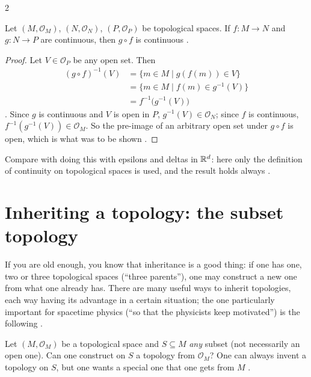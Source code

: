 \begin{paracol}{2}
\begin{theorem}\label{thm:c01-composition}
Let $(M,\mathcal O_M)$, $(N,\mathcal O_N)$, $(P,\mathcal O_P)$ be topological spaces. If $f\colon M\to N$ and $g\colon N\to P$ are continuous, then
$g\circ f$ is continuous .
\end{theorem}
\begin{proof}
Let $V\in\mathcal O_P$ be any open set. Then
\begin{align*}
  (g\circ f)^{-1}(V)&=\{m\in M\mid g(f(m))\in V\}\\
  &=\{m\in M\mid f(m)\in g^{-1}(V)\}\\
  &=f^{-1}\bigl(g^{-1}(V)\bigr)
\end{align*}
. Since $g$ is continuous and $V$ is open in $P$, $g^{-1}(V)\in\mathcal O_N$; since $f$ is
continuous, $f^{-1}(g^{-1}(V))\in\mathcal O_M$. So the pre-image of an arbitrary open set under $g\circ f$ is open, which is what was to be shown
.
\end{proof}
Compare with doing this with epsilons and deltas in $\mathbb{R}^d$: here only the definition of continuity on topological spaces is used, and the result holds always
.

\section{Inheriting a topology: the subset topology}\label{sec:c01-subset}

If you are old enough, you know that inheritance is a good thing: if one has one, two or three topological spaces (``three parents''), one may construct a new one from what one
already has. There are many useful ways to inherit topologies, each way having its advantage in a certain situation; the one particularly important for spacetime physics
(``so that the physicists keep motivated'') is the following .

Let $(M,\mathcal O_M)$ be a topological space and $S\subseteq M$ \emph{any} subset (not necessarily an open one). Can one construct on $S$ a topology from $\mathcal O_M$? One
can always invent a topology on $S$, but one wants a special one that one gets from $M$ .


\end{paracol}

